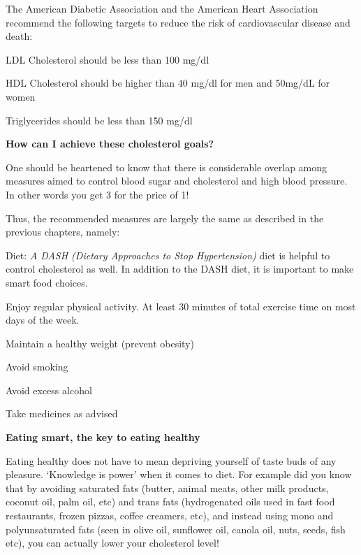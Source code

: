 {The American Diabetic Association and the American Heart Association recommend the following targets to reduce the risk of cardiovascular disease and death:

\item LDL Cholesterol should be less than 100 mg/dl

 \item HDL Cholesterol should be higher than 40 mg/dl for men and 50mg/dL for women

 \item Triglycerides should be less than 150 mg/dl

\textbf{How can I achieve these cholesterol goals?}

One should be heartened to know that there is considerable overlap among measures aimed to control blood sugar and cholesterol and high blood pressure. In other words you get 3 for the price of 1!

Thus, the recommended measures are largely the same as described in the previous chapters, namely:

\item Diet: \textit{A DASH (Dietary Approaches to Stop Hypertension)} diet is helpful to control cholesterol as well. In addition to the DASH diet, it is important to make smart food choices.

 \item Enjoy regular physical activity. At least 30 minutes of total exercise time on most days of the week.

 \item Maintain a healthy weight (prevent obesity)

 \item Avoid smoking

 \item Avoid excess alcohol

 \item Take medicines as advised

\textbf{Eating smart, the key to eating healthy}

Eating healthy does not have to mean depriving yourself of taste buds of any pleasure. ‘Knowledge is power’ when it comes to diet. For example did you know that by avoiding saturated fats (butter, animal meats, other milk products, coconut oil, palm oil, etc) and trans fats (hydrogenated oils used in fast food restaurants, frozen pizzas, coffee creamers, etc), and instead using mono and polyunsaturated fats (seen in olive oil, sunflower oil, canola oil, nuts, seeds, fish etc), you can actually lower your cholesterol level!

}
